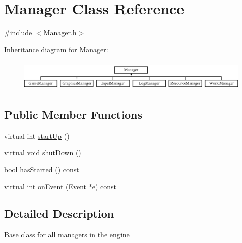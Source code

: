 \hypertarget{class_manager}{\section{Manager Class Reference}
\label{class_manager}
}


{\ttfamily \#include $<$Manager.\+h$>$}

Inheritance diagram for Manager\+:\begin{figure}[H]
\begin{center}
\leavevmode
\includegraphics[height=1.493333cm]{class_manager}
\end{center}
\end{figure}
\subsection*{Public Member Functions}
\begin{DoxyCompactItemize}
\item 
virtual int \hyperlink{class_manager_a2a0f0d6810a5a051afd707d83ff1ff36}{start\+Up} ()
\item 
virtual void \hyperlink{class_manager_a09f0aaf6012be52b75a12fac25370f61}{shut\+Down} ()
\item 
bool \hyperlink{class_manager_aa5b4c6cc66d0bb5e803d9fab953a1b39}{has\+Started} () const 
\item 
virtual int \hyperlink{class_manager_abfdbe16dc74a246b70a183351e100989}{on\+Event} (\hyperlink{class_event}{Event} $\ast$e) const 
\end{DoxyCompactItemize}


\subsection{Detailed Description}
Base class for all managers in the engine 

